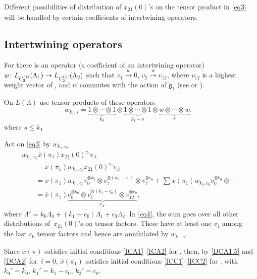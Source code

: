 \documentclass[10pt,a4paper]{amsart}
\newcommand{\gt}
{\tilde{{\mathfrak g}}}
\newcommand{\ox}
{{\overline{x}}}
\numberwithin{equation}{section}
\begin{document}
Different possibilities of distribution of $x_{2\underline{1}}(0)$'s on the tensor product  in \eqref{eq3} will be handled by certain coefficients of intertwining operators.

\subsection{Intertwining operators}

For  there is an operator (a coefficient of an intertwining operator) $w\colon \smash{L_{C_2^{(1)}}(\Lambda_1)}\to \smash{L_{C_2^{(1)}}(\Lambda_2)}$ such that
$v_1 \xrightarrow{w} 0$, $ v_2 \xrightarrow{w} v_{12}$,
where $v_{12}$ is a highest weight vector of , and $w$ commutes with the action of $\gt_1$ (see \cite[Proposition~7]{BPT} or \cite[Remark~6.3]{P}).

On $L(\Lambda)$ use tensor products of these operators
\[w_{k_1,s}=\underbrace{1\otimes\cdots\otimes 1}_{k_0}\otimes \underbrace{1\otimes\cdots\otimes 1}_{k_1 - s}\otimes \underbrace{w\otimes\cdots\otimes w}_{s},\]
where $s\leq k_1$

Act on \eqref{eq3} by $w_{k_1,c_0}$
\begin{gather}
	w_{k_1,c_0}  \ox(\pi_1) x_{2\underline{1}}(0)^{c_0} v_\Lambda\nonumber\\
\qquad = \ox(\pi_1) w_{k_1,c_0} x_{2\underline{1}}(0)^{c_0} v_\Lambda\nonumber \\
	\qquad = \ox(\pi_1) w_{k_1,c_0} v_0^{\otimes k_0}\otimes v_1^{\otimes (k_1-c_0)}\otimes v_2^{\otimes c_0} + \sum \ox(\pi_1) w_{k_1,c_0} v_0^{\otimes k_0}\otimes \cdots \label{eq4}\\
	\qquad = \ox(\pi_1) \underbrace{v_0^{\otimes k_0}\otimes v_1^{\otimes (k_1-c_0)}\otimes v_{12}^{\otimes c_0}}_{v_{\Lambda'}},\nonumber
\end{gather}
where $\Lambda'=k_0 \Lambda_0+(k_1-c_0)\Lambda_1 + c_0 \Lambda_2$.
In \eqref{eq4}, the sum goes over all other distributions of~$x_{2\underline{1}}(0)$'s on tensor factors. These have at least one $v_1$ among the last $c_0$ tensor factors and hence are annihilated by $w_{k_1,c_0}$.

Since $x(\pi)$ satisfies initial conditions \eqref{ICA1}--\eqref{ICA2} for , then,
by \eqref{DCA1.5} and \eqref{DCA2} for~${i=0}$,
$\ox(\pi_1)$ satisfies initial conditions \eqref{ICC1}--\eqref{ICC2} for , with $k_0'=k_0$, $k_1'=k_1-c_0$, $k_2'=c_0$.
\end{document}
